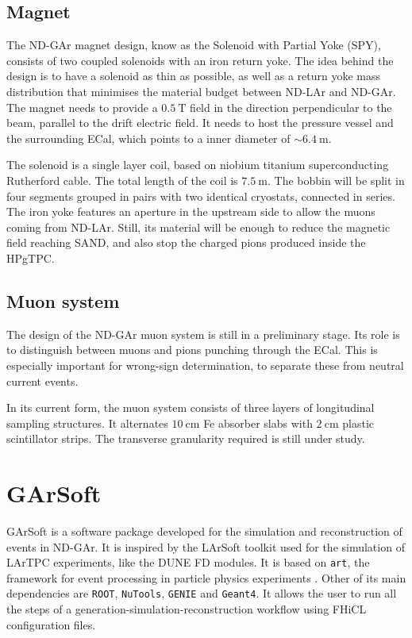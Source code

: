 \subsection{Magnet}

The ND-GAr magnet design, know as the Solenoid with Partial Yoke (SPY), consists of two coupled solenoids with an iron return yoke. The idea behind the design is to have a solenoid as thin as possible, as well as a return yoke mass distribution that minimises the material budget between ND-LAr and ND-GAr. The magnet needs to provide a $0.5~\mathrm{T}$ field in the direction perpendicular to the beam, parallel to the drift electric field. It needs to host the pressure vessel and the surrounding ECal, which points to a inner diameter of $\sim6.4~\mathrm{m}$.

The solenoid is a single layer coil, based on niobium titanium superconducting Rutherford cable. The total length of the coil is $7.5~\mathrm{m}$. The bobbin will be split in four segments grouped in pairs with two identical cryostats, connected in series. The iron yoke features an aperture in the upstream side to allow the muons coming from ND-LAr. Still, its material will be enough to reduce the magnetic field reaching SAND, and also stop the charged pions produced inside the HPgTPC.

\subsection{Muon system}

The design of the ND-GAr muon system is still in a preliminary stage. Its role is to distinguish between muons and pions punching through the ECal. This is especially important for wrong-sign determination, to separate these from neutral current events.

In its current form, the muon system consists of three layers of longitudinal sampling structures. It alternates $10~\mathrm{cm}$ Fe absorber slabs with $2~\mathrm{cm}$ plastic scintillator strips. The transverse granularity required is still under study.

\section{GArSoft}

GArSoft is a software package developed for the simulation and reconstruction of events in ND-GAr. It is inspired by the LArSoft toolkit used for the simulation of LArTPC experiments, like the DUNE FD modules. It is based on \texttt{art}, the framework for event processing in particle physics experiments \cite{ART}. Other of its main dependencies are \texttt{ROOT}, \texttt{NuTools}, \texttt{GENIE} and \texttt{Geant4}. It allows the user to run all the steps of a generation-simulation-reconstruction workflow using FHiCL configuration files.

